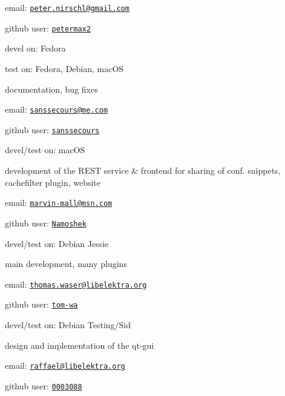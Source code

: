 \begin{DoxyItemize}
\item email\+: \href{mailto:peter.nirschl@gmail.com}{\tt peter.\+nirschl@gmail.\+com}
\item github user\+: \href{http://github.com/petermax2}{\tt petermax2}
\item devel on\+: Fedora
\item test on\+: Fedora, Debian, mac\+OS
\end{DoxyItemize}

documentation, bug fixes


\begin{DoxyItemize}
\item email\+: \href{mailto:sanssecours@me.com}{\tt sanssecours@me.\+com}
\item github user\+: \href{http://github.com/sanssecours}{\tt sanssecours}
\item devel/test on\+: mac\+OS
\end{DoxyItemize}

development of the R\+E\+ST service \& frontend for sharing of conf. snippets, cachefilter plugin, website


\begin{DoxyItemize}
\item email\+: \href{mailto:marvin-mall@msn.com}{\tt marvin-\/mall@msn.\+com}
\item github user\+: \href{https://github.com/Namoshek}{\tt Namoshek}
\item devel/test on\+: Debian Jessie
\end{DoxyItemize}

main development, many plugins


\begin{DoxyItemize}
\item email\+: \href{mailto:thomas.waser@libelektra.org}{\tt thomas.\+waser@libelektra.\+org}
\item github user\+: \href{https://github.com/tom-wa}{\tt tom-\/wa}
\item devel/test on\+: Debian Testing/\+Sid
\end{DoxyItemize}

design and implementation of the qt-\/gui


\begin{DoxyItemize}
\item email\+: \href{mailto:raffael@libelektra.org}{\tt raffael@libelektra.\+org}
\item github user\+: \href{https://github.com/0003088}{\tt 0003088}
\end{DoxyItemize}

